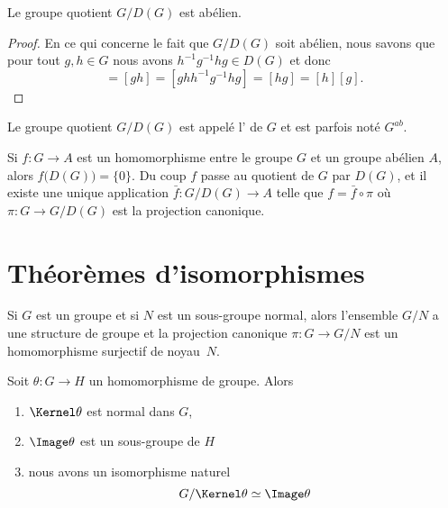 \begin{proposition}\label{PropAPRGooHBkELf}
    Le groupe quotient \( G/D(G)\) est abélien.
\end{proposition}

\begin{proof}
    En ce qui concerne le fait que \( G/D(G)\) soit abélien, nous savons que pour tout \( g,h\in G\) nous avons \( h^{-1}g^{-1}hg\in D(G)\) et donc
    \begin{equation}
        [g][h]=[gh]=[ghh^{-1}g^{-1}hg]=[hg]=[h][g].
    \end{equation}
\end{proof}

Le groupe quotient \( G/D(G)\) est appelé l' de \( G\) et est parfois noté \( G^{ab}\).

Si \( f\colon G\to A\) est un homomorphisme entre le groupe \( G\) et un groupe abélien \( A\), alors \( f\big( D(G) \big)=\{ 0 \}\). Du coup \( f\) passe au quotient de \( G\) par \( D(G)\), et il existe une unique application \( \bar f\colon G/D(G)\to A\) telle que \( f=\bar f\circ \pi\) où \( \pi\colon G\to G/D(G)\) est la projection canonique.

\section{Théorèmes d'isomorphismes}

Si \( G\) est un groupe et si \( N\) est un sous-groupe normal, alors l'ensemble \( G/N\) a une structure de groupe et la projection canonique \( \pi\colon G\to G/N\) est un homomorphisme surjectif de noyau~\( N\).

\begin{theorem}        \label{ThoPremierthoisomo}
    Soit \( \theta\colon G\to H\) un homomorphisme de groupe. Alors
    \begin{enumerate}
        \item
            \( \Kernel\theta\) est normal dans \( G\),
        \item
            \( \Image \theta\) est un sous-groupe de \( H\)
        \item   \label{ItemWLCLdk}
            nous avons un isomorphisme naturel
            \begin{equation}
                G/\Kernel\theta\simeq \Image\theta
            \end{equation}
    \end{enumerate}
\end{theorem}

